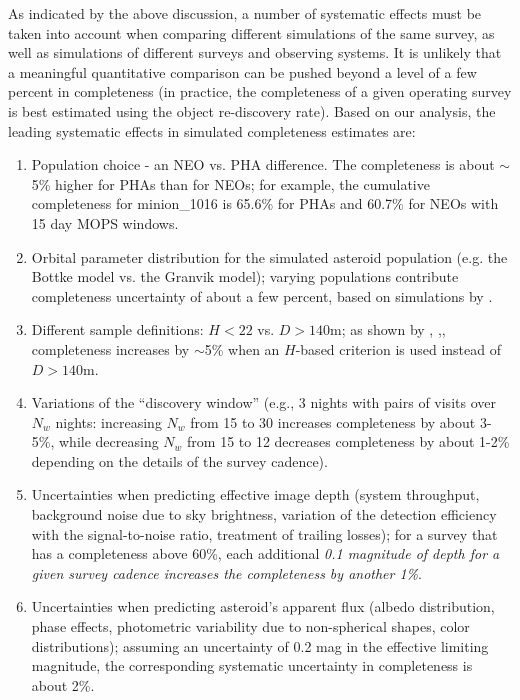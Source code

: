 As indicated by the above discussion, a number of systematic effects must be taken into account when
comparing different simulations of the same survey, as well as simulations of different surveys and observing
systems. It is unlikely that a meaningful quantitative comparison can be pushed beyond a level of a few percent
in completeness (in practice, the completeness of a given operating survey is best estimated using the object
re-discovery rate). Based on our analysis, the leading systematic effects in simulated completeness estimates are:
\begin{enumerate}
\item Population choice - an NEO vs. PHA difference. The completeness is about $\sim$5\% higher for PHAs than for NEOs; for example,
the cumulative completeness for minion\_1016 is 65.6\% for PHAs and 60.7\% for NEOs with 15 day MOPS windows.
\item Orbital parameter distribution for the simulated asteroid population (e.g. the Bottke model
             vs. the Granvik model); varying populations contribute completeness uncertainty of about a few percent, based
             on simulations by \citet{VeresChesley2017neo}. 
\item Different sample definitions: $H<22$ vs. $D>140$m; as shown by  \citet{2016AJ....152...79W}, \citealt{GMS2016},,
          completeness increases by $\sim$5\% when an $H$-based criterion is used instead of $D>140$m.
\item Variations of the ``discovery window'' (e.g., 3 nights with pairs of visits over $N_w$ nights: increasing
        $N_w$ from 15 to 30 increases completeness by about 3-5\%, while decreasing $N_w$ from 15 to 12 decreases 
        completeness by about 1-2\% depending on the details of the survey cadence).
\item Uncertainties when predicting effective image depth (system throughput, background noise due to sky brightness, 
          variation of the detection efficiency with the signal-to-noise ratio, treatment of trailing losses); for a survey that has a 
          completeness above 60\%, each additional {\it 0.1 magnitude of depth for a given survey cadence increases the 
          completeness by another 1\%}.
\item Uncertainties when predicting asteroid's apparent flux (albedo distribution, phase effects, photometric variability
          due to non-spherical shapes, color distributions); assuming an uncertainty of 0.2 mag in the effective
          limiting magnitude, the corresponding  systematic uncertainty in completeness is about 2\%.

\end{enumerate}
